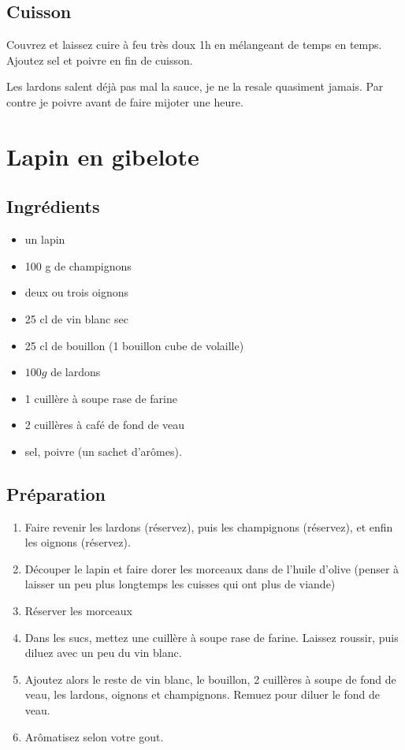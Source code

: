 \subsection*{Cuisson}
Couvrez et laissez cuire à feu très doux 1h en mélangeant de temps en temps. Ajoutez sel et poivre en fin de cuisson.
\begin{remarque}
Les lardons salent déjà pas mal la sauce, je ne la resale quasiment jamais. Par contre je poivre avant de faire mijoter une heure.
\end{remarque}

\newpage
\section{Lapin en gibelote}
\subsection*{Ingrédients}
\begin{itemize}
\item un lapin
\item 100 g de champignons
\item deux ou trois oignons
\item 25 cl de vin blanc sec
\item 25 cl de bouillon (1 bouillon cube de volaille)
\item $100\unit{g}$ de lardons
\item 1 cuillère à soupe rase de farine
\item 2 cuillères à café de fond de veau
\item sel, poivre (un sachet d'arômes).
\end{itemize}

\subsection*{Préparation}
\begin{enumerate}
\item Faire revenir les lardons (réservez), puis les champignons (réservez), et enfin les oignons (réservez).
\item Découper le lapin et faire dorer les morceaux dans de l'huile d'olive (penser à laisser un peu plus longtemps les cuisses qui ont plus de viande)
\item Réserver les morceaux
\item Dans les sucs, mettez une cuillère à soupe rase de farine. Laissez roussir, puis diluez avec un peu du vin blanc.
\item Ajoutez alors le reste de vin blanc, le bouillon, 2 cuillères à soupe de fond de veau, les lardons, oignons et champignons. Remuez pour diluer le fond de veau.
\item Arômatisez selon votre gout.
\end{enumerate}

